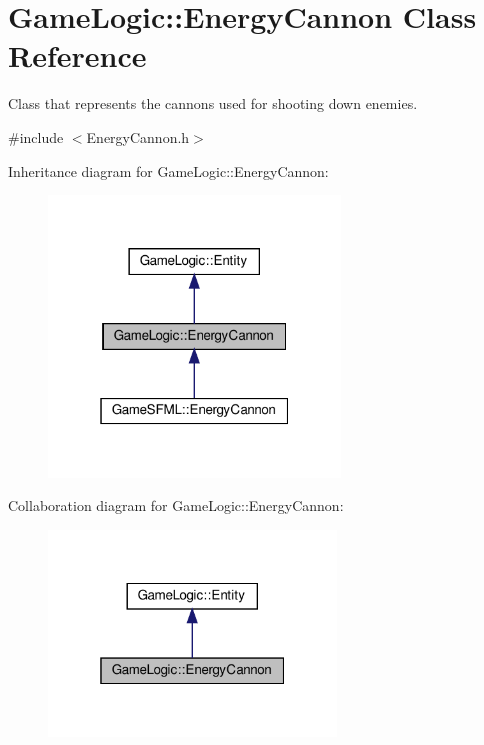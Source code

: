 \hypertarget{classGameLogic_1_1EnergyCannon}{}\section{Game\+Logic\+:\+:Energy\+Cannon Class Reference}
\label{classGameLogic_1_1EnergyCannon}


Class that represents the cannons used for shooting down enemies.  




{\ttfamily \#include $<$Energy\+Cannon.\+h$>$}



Inheritance diagram for Game\+Logic\+:\+:Energy\+Cannon\+:
\nopagebreak
\begin{figure}[H]
\begin{center}
\leavevmode
\includegraphics[width=220pt]{classGameLogic_1_1EnergyCannon__inherit__graph}
\end{center}
\end{figure}


Collaboration diagram for Game\+Logic\+:\+:Energy\+Cannon\+:
\nopagebreak
\begin{figure}[H]
\begin{center}
\leavevmode
\includegraphics[width=217pt]{classGameLogic_1_1EnergyCannon__coll__graph}
\end{center}
\end{figure}
